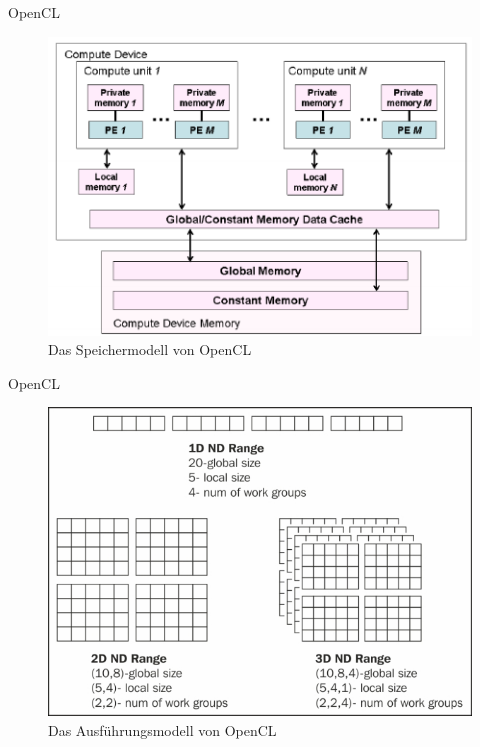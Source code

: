 \documentclass[10pt]{beamer}
\begin{document}
\begin{frame}{OpenCL}
  \begin{figure}
    \centering
    \includegraphics[width=.75\linewidth]{figures/fg-opencl-memory-model.png}
    \caption{Das Speichermodell von OpenCL\footnotemark[1]}
  \end{figure}

  \footnotesize
  \normalsize
\end{frame}

\begin{frame}{OpenCL}
  \begin{figure}
    \centering
    \includegraphics[width=.75\linewidth]{figures/fg-opencl-execution-model.jpg}
    \caption{Das Ausführungsmodell von OpenCL\footnotemark[1]}
  \end{figure}

  \footnotesize
  \normalsize
\end{frame}
\end{document}
